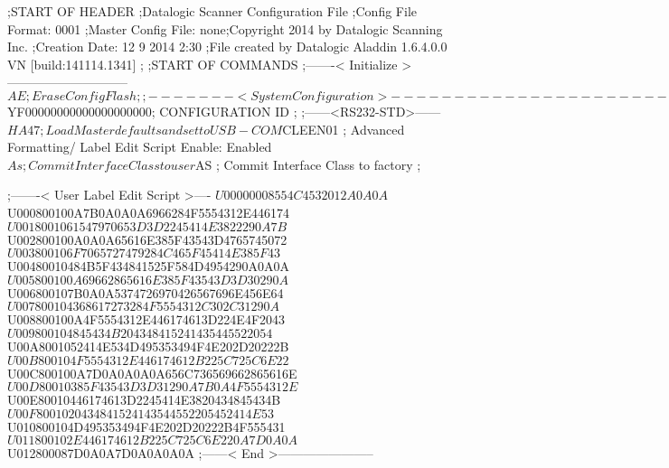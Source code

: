 ;START OF HEADER
;Datalogic Scanner Configuration File
;Config File Format: 0001
;Master Config File: none;Copyright 2014 by Datalogic Scanning Inc.
;Creation Date: 12 9 2014 2:30
;File created by Datalogic Aladdin 1.6.4.0.0 VN [build:141114.1341]
;
;START OF COMMANDS
;-------< Initialize >-----------------------------
$AE                 ; Erase Config Flash
;
;-------< System Configuration >-------------------------------
$YF00000000000000000000; CONFIGURATION ID
;
;------<RS232-STD>------
$HA47               ; Load Master defaults and set to USB-COM
$CLEEN01            ; Advanced Formatting/ Label Edit Script Enable: Enabled
$As                 ; Commit Interface Class to user
$AS                 ; Commit Interface Class to factory
;

;-------< User Label Edit Script >----
$U00000008554C4532012A0A0A
$U000800100A7B0A0A0A6966284F5554312E446174
$U0018001061547970653D3D2245414E3822290A7B
$U002800100A0A0A65616E385F43543D4765745072
$U003800106F7065727479284C465F45414E385F43
$U00480010484B5F434841525F584D4954290A0A0A
$U005800100A69662865616E385F43543D3D30290A
$U006800107B0A0A5374726970426567696E456E64
$U007800104368617273284F5554312C302C31290A
$U008800100A4F5554312E446174613D224E4F2043
$U009800104845434B204348415241435445522054
$U00A8001052414E534D495353494F4E202D20222B
$U00B800104F5554312E446174612B225C725C6E22
$U00C800100A7D0A0A0A0A656C736569662865616E
$U00D80010385F43543D3D31290A7B0A4F5554312E
$U00E80010446174613D2245414E3820434845434B
$U00F8001020434841524143544552205452414E53
$U010800104D495353494F4E202D20222B4F555431
$U011800102E446174612B225C725C6E220A7D0A0A
$U012800087D0A0A7D0A0A0A0A
;------< End >-----------------------
